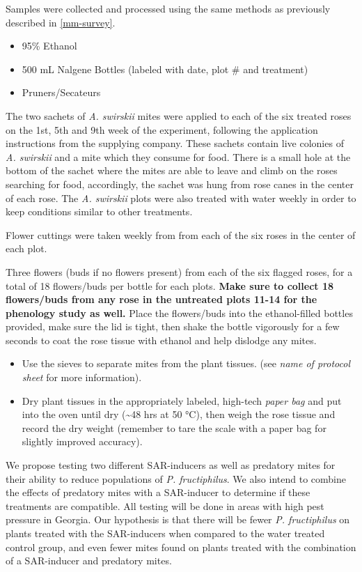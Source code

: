 \documentclass[12pt,final,CPage]{ufthesis}
\begin{document}
{  Samples were collected and processed using the same methods as previously described in \ref{mm-survey}.
  \begin{itemize}
  \tightlist
  \item
    95\% Ethanol
  \item
    500 mL Nalgene Bottles (labeled with date, plot \# and treatment)
  \item
    Pruners/Secateurs
  \end{itemize}
  The two sachets of \emph{A. swirskii} mites were applied to each of the six treated roses on the 1st, 5th and 9th week of the experiment, following the application instructions from the supplying company. These sachets contain live colonies of \emph{A. swirskii} and a mite which they consume for food. There is a small hole at the bottom of the sachet where the mites are able to leave and climb on the roses searching for food, accordingly, the sachet was hung from rose canes in the center of each rose. The \emph{A. swirskii} plots were also treated with water weekly in order to keep conditions similar to other treatments.

  Flower cuttings were taken weekly from from each of the six roses in the center of each plot.

  Three flowers (buds if no flowers present) from each of the six flagged roses, for a total of 18 flowers/buds per bottle for each plots. \textbf{Make sure to collect 18 flowers/buds from any rose in the untreated plots 11-14 for the phenology study as well.} Place the flowers/buds into the ethanol-filled bottles provided, make sure the lid is tight, then shake the bottle vigorously for a few seconds to coat the rose tissue with ethanol and help dislodge any mites.
  \begin{itemize}
  \item
    Use the sieves to separate mites from the plant tissues. (see \emph{name of protocol sheet} for more information).
  \item
    Dry plant tissues in the appropriately labeled, high-tech \emph{paper bag} and put into the oven until dry (\textasciitilde48 hrs at 50 °C), then weigh the rose tissue and record the dry weight (remember to tare the scale with a paper bag for slightly improved accuracy).
  \end{itemize}
  We propose testing two different SAR-inducers as well as predatory mites for their ability to reduce populations of \emph{P. fructiphilus}. We also intend to combine the effects of predatory mites with a SAR-inducer to determine if these treatments are compatible. All testing will be done in areas with high pest pressure in Georgia. Our hypothesis is that there will be fewer \emph{P. fructiphilus} on plants treated with the SAR-inducers when compared to the water treated control group, and even fewer mites found on plants treated with the combination of a SAR-inducer and predatory mites.

}
\end{document}
